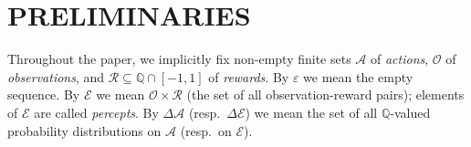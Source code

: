 \documentclass[twoside]{article}
\begin{document}
\section{PRELIMINARIES}


Throughout the paper, we implicitly
fix non-empty finite sets $\mathcal A$ of \emph{actions},
$\mathcal O$ of \emph{observations},
and $\mathcal R\subseteq \mathbb Q\cap [-1,1]$ of \emph{rewards}.
By $\varepsilon$ we mean the empty sequence.
By $\mathcal E$ we mean $\mathcal O\times\mathcal R$ (the set of all observation-reward
pairs); elements of $\mathcal E$ are called \emph{percepts}.
By $\Delta\mathcal A$ (resp.\ $\Delta\mathcal E$) we mean the set of all $\mathbb Q$-valued
probability distributions on $\mathcal A$ (resp.\ on $\mathcal E$).
\end{document}
